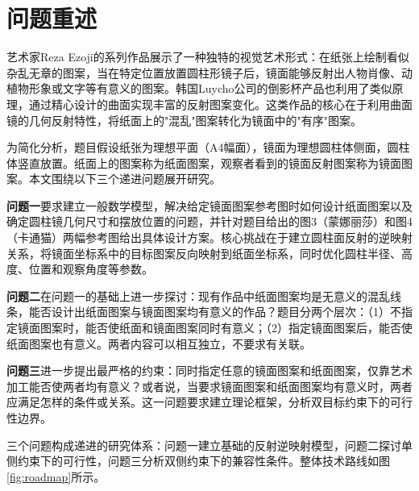 \section{问题重述}

艺术家Reza Ezoji的系列作品展示了一种独特的视觉艺术形式：在纸张上绘制看似杂乱无章的图案，当在特定位置放置圆柱形镜子后，镜面能够反射出人物肖像、动植物形象或文字等有意义的图案。韩国Luycho公司的倒影杯产品也利用了类似原理，通过精心设计的曲面实现丰富的反射图案变化。这类作品的核心在于利用曲面镜的几何反射特性，将纸面上的"混乱"图案转化为镜面中的"有序"图案。

为简化分析，题目假设纸张为理想平面（A4幅面），镜面为理想圆柱体侧面，圆柱体竖直放置。纸面上的图案称为纸面图案，观察者看到的镜面反射图案称为镜面图案。本文围绕以下三个递进问题展开研究。

\textbf{问题一}要求建立一般数学模型，解决给定镜面图案参考图时如何设计纸面图案以及确定圆柱镜几何尺寸和摆放位置的问题，并针对题目给出的图3（蒙娜丽莎）和图4（卡通猫）两幅参考图给出具体设计方案。核心挑战在于建立圆柱面反射的逆映射关系，将镜面坐标系中的目标图案反向映射到纸面坐标系，同时优化圆柱半径、高度、位置和观察角度等参数。

\textbf{问题二}在问题一的基础上进一步探讨：现有作品中纸面图案均是无意义的混乱线条，能否设计出纸面图案与镜面图案均有意义的作品？题目分两个层次：（1）不指定镜面图案时，能否使纸面和镜面图案同时有意义；（2）指定镜面图案后，能否使纸面图案也有意义。两者内容可以相互独立，不要求有关联。

\textbf{问题三}进一步提出最严格的约束：同时指定任意的镜面图案和纸面图案，仅靠艺术加工能否使两者均有意义？或者说，当要求镜面图案和纸面图案均有意义时，两者应满足怎样的条件或关系。这一问题要求建立理论框架，分析双目标约束下的可行性边界。

三个问题构成递进的研究体系：问题一建立基础的反射逆映射模型，问题二探讨单侧约束下的可行性，问题三分析双侧约束下的兼容性条件。整体技术路线如图\ref{fig:roadmap}所示。


